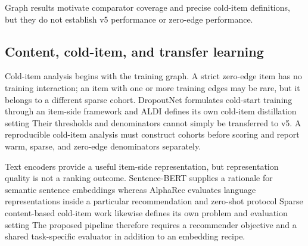 \documentclass[10pt,a4paper]{article}
\begin{document}
Graph results motivate comparator coverage and precise cold-item definitions,
but they do not establish v5 performance or zero-edge performance.

\subsection{Content, cold-item, and transfer learning}

Cold-item analysis begins with the training graph. A strict zero-edge item has no
training interaction; an item with one or more training edges may be rare, but it
belongs to a different sparse cohort. DropoutNet formulates cold-start training
through an item-side framework
\cite{volkovs2017_dropoutnet} %
and ALDI defines its own cold-item distillation setting
\cite{huang2023_aldi} %
Their thresholds and denominators cannot simply be transferred to v5. A
reproducible cold-item analysis must construct cohorts before scoring and report
warm, sparse, and zero-edge denominators separately.

Text encoders provide a useful item-side representation, but representation
quality is not a ranking outcome. Sentence-BERT supplies a rationale for
semantic sentence embeddings
\cite{reimers2019_sbert} %
whereas AlphaRec evaluates language representations inside a particular
recommendation and zero-shot protocol
\cite{sheng2025_alpharec} %
Sparse content-based cold-item work likewise defines its own problem and
evaluation setting
\cite{meehan2026_semco} %
The proposed pipeline therefore requires a recommender objective and a shared
task-specific evaluator in addition to an embedding recipe.
\end{document}
